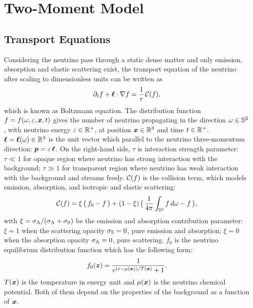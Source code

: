 \section{Two-Moment Model}\label{se:Two-MomentModel}

\subsection{Transport Equations}
Considering the neutrino pass through a static dense matter and only emission, absorption and elastic scattering exist, the transport equation of the neutrino after scaling to dimensionless units can be written as
\begin{equation}
  \pd{f}{t}+\vect{\ell}\cdot\nabla f
  =\f{1}{\tau}\,\cC(f),
  \label{eq:boltzmann}
\end{equation}
which is known as Boltzmann equation.
The distribution function $f = f(\omega,\varepsilon,\boldsymbol{x},t)$ gives the number of neutrino propagating in the direction $\omega\in\mathbb{S}^{2}$, with neutrino energy $\varepsilon\in\mathbb{R}^{+}$, at position $\boldsymbol{x}\in\mathbb{R}^{3}$ and time $t\in\mathbb{R}^{+}$.  
$\boldsymbol{\ell} = \boldsymbol{\ell}(\omega)\in\mathbb{R}^{3}$ is the unit vector which parallel to the neutrino three-momentum direction: $\boldsymbol{p}=\varepsilon\,\boldsymbol{\ell}$.
On the right-hand side, $\tau$ is interaction strength parameter: $\tau\ll1$ for opaque region where neutrino has strong interaction with the background; $\tau\gg1$ for transparent region where neutrino has weak interaction with the background and streams freely.
$\mathcal{C}(f)$ is the collision term, which models emission, absorption, and isotropic and elastic scattering: 
\begin{equation}
  \cC(f)=\xi\,\big(\,f_{0}-f\,\big)
  +(1-\xi)\,\big(\,\f{1}{4\pi}\int_{\bbS^{2}}f\,d\omega-f\,\big),
  \label{eq:collisionTerm}
\end{equation}
with $\xi = \sigma_{{\rm A}} / (\sigma_{{\rm A}}  + \sigma_{{\rm S}} )$ be the emission and absorption contribution parameter: $\xi = 1$ when the scattering opacity $\sigma_{{\rm S}} = 0$, pure emission and absorption; $\xi = 0$ when the absorption opacity $\sigma_{{\rm A}} = 0$, pure scattering. 
$f_{0}$ is the neutrino equilibrium distribution function which has the following form:
\begin{equation}
  f_{0}(\vect{z})=\f{1}{e^{(\varepsilon-\mu(\vect{x}))/T(\vect{x})}+1}.
  \label{eq:fermiDirac}
\end{equation}
$T(\boldsymbol{x})$ is the temperature in energy unit and $\mu(\boldsymbol{x})$ is the neutrino chemical potential.
Both of them depend on the properties of the background as a function of $\boldsymbol{x}$.

